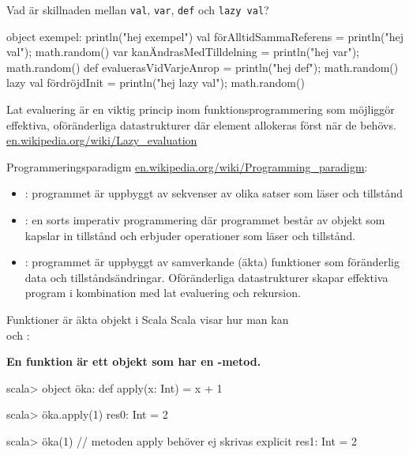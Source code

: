 \begin{Slide}{Vad är skillnaden mellan \texttt{val}, \texttt{var}, \texttt{def} och \texttt{lazy val}?}
\begin{Code}[basicstyle=\ttfamily\fontsize{8}{11}\selectfont]
object exempel:
  println("hej exempel")
  val förAlltidSammaReferens  = {println("hej val"); math.random()}
  var kanÄndrasMedTilldelning = {println("hej var"); math.random()}
  def evaluerasVidVarjeAnrop  = {println("hej def"); math.random()}
  lazy val fördröjdInit = {println("hej lazy val"); math.random()}
\end{Code}
\vspace{1em}\pause
Lat evaluering är en viktig princip inom funktionsprogrammering som möjliggör effektiva, oföränderliga datastrukturer där element allokeras först när de behövs. \\
\href{https://en.wikipedia.org/wiki/Lazy_evaluation}{en.wikipedia.org/wiki/Lazy\_evaluation}
\end{Slide}





\begin{Slide}{Programmeringsparadigm}
\href{https://en.wikipedia.org/wiki/Programming_paradigm}{en.wikipedia.org/wiki/Programming\_paradigm}:
\begin{itemize}
\item {}: programmet är uppbyggt av sekvenser av olika satser som läser och  tillstånd
\item {}: en sorts imperativ programmering där programmet består av objekt som kapslar in tillstånd och erbjuder operationer som läser och  tillstånd.
\item {}: programmet är uppbyggt av samverkande (äkta) funktioner som  föränderlig data och tillståndsändringar. Oföränderliga datastrukturer skapar effektiva program i kombination med lat evaluering och rekursion.
\end{itemize}
\end{Slide}


\begin{Slide}{Funktioner är äkta objekt i Scala}
Scala visar hur man kan   \\  och : \\\vspace{0.5em}

\textbf{En funktion är ett objekt som har en -metod.}
\pause
\begin{REPLnonum}
scala> object öka:
         def apply(x: Int) = x + 1

scala> öka.apply(1)
res0: Int = 2

scala> öka(1)   // metoden apply behöver ej skrivas explicit
res1: Int = 2
\end{REPLnonum}
\end{Slide}



